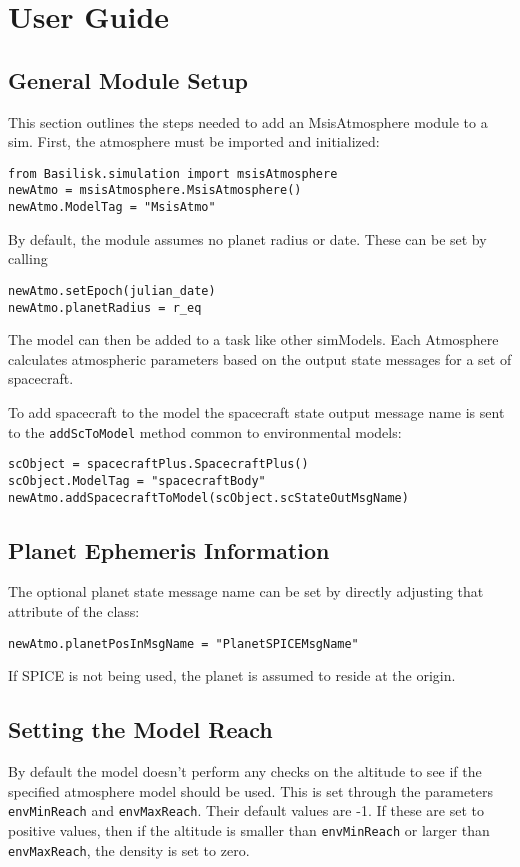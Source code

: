 
\section{User Guide}

\subsection{General Module Setup}
This section outlines the steps needed to add an MsisAtmosphere module to a sim.
First, the atmosphere must be imported and initialized:
\begin{verbatim}
from Basilisk.simulation import msisAtmosphere
newAtmo = msisAtmosphere.MsisAtmosphere()
newAtmo.ModelTag = "MsisAtmo"
\end{verbatim}

By default, the module assumes no planet radius or date. These can be set by calling
\begin{verbatim}
newAtmo.setEpoch(julian_date)
newAtmo.planetRadius = r_eq
\end{verbatim}
The model can then be added to a task like other simModels. Each Atmosphere calculates atmospheric parameters based on the output state messages for a set of spacecraft.

To add spacecraft to the model the spacecraft state output message name is sent to the \verb|addScToModel| method common to environmental models:
\begin{verbatim}
scObject = spacecraftPlus.SpacecraftPlus()
scObject.ModelTag = "spacecraftBody"
newAtmo.addSpacecraftToModel(scObject.scStateOutMsgName)
\end{verbatim}

\subsection{Planet Ephemeris Information}
The optional planet state message name can be set by directly adjusting that attribute of the class:
\begin{verbatim}
newAtmo.planetPosInMsgName = "PlanetSPICEMsgName"
\end{verbatim}
If SPICE is not being used, the planet is assumed to reside at the origin.

\subsection{Setting the Model Reach}
By default the model doesn't perform any checks on the altitude to see if the specified atmosphere model should be used.  This is set through the parameters {\tt envMinReach} and {\tt envMaxReach}.  Their default values are -1.  If these are set to positive values, then if the altitude is smaller than {\tt envMinReach} or larger than {\tt envMaxReach}, the density is set to zero.


